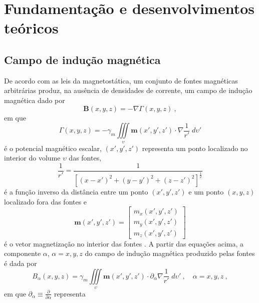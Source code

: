 \chapter{Fundamentação e desenvolvimentos teóricos}
\label{chap:fundamentacao}


\section{Campo de indução magnética}
\label{sec:campo}

De acordo com as leis da magnetostática, um conjunto de fontes magnéticas arbitrárias produz, 
na ausência de densidades de corrente, um campo de indução magnética dado por
\begin{equation}
\mathbf{B}(x, y, z) = - \nabla \Gamma(x, y, z) \: ,
\label{eq:B-true-generic}
\end{equation}
em que 
\begin{equation}
\Gamma(x, y, z) = - \gamma_{m} \iiint\limits_{\upsilon} \mathbf{m}(x', y', z') \cdot \nabla\frac{1}{r'} 
\; d\upsilon'
\label{eq:Gamma-potential}
\end{equation}
é o potencial magnético escalar, $(x', y', z')$ representa um ponto localizado no interior do 
volume $\upsilon$ das fontes, 
\begin{equation}
\frac{1}{r'} = \frac{1}{\left[ (x - x')^{2} + (y - y')^{2} + (z - z')^{2} \right]^{\frac{1}{2}}}
\label{eq:inv-r'}
\end{equation}
é a função inverso da distância entre um ponto $(x', y', z')$ e um ponto $(x, y, z)$ localizado fora
das fontes e 
\begin{equation}
\mathbf{m}(x', y', z') = \begin{bmatrix}
m_{x}(x', y', z') \\
m_{y}(x', y', z') \\
m_{z}(x', y', z')
\end{bmatrix}
\label{eq:mag-vector-true-generic}
\end{equation}
é o vetor magnetização no interior das fontes \citep[][ p. 175, 193]{jackson1975}.
A partir das equações acima, a componente $\alpha$, $\alpha = x, y, z$ do campo de indução 
magnética produzido pelas fontes é dada por
\begin{equation}
B_{\alpha}(x, y, z) = \gamma_{m} \iiint\limits_{\upsilon} 
\mathbf{m}(x', y', z') \cdot \partial_{\alpha} \nabla \frac{1}{r'} 
\; d\upsilon' \: , \quad \alpha = x, y, z \: ,
\label{eq:B-alpha-true-generic}
\end{equation}
em que $\partial_{\alpha} \equiv \frac{\partial}{\partial \alpha}$ representa 
